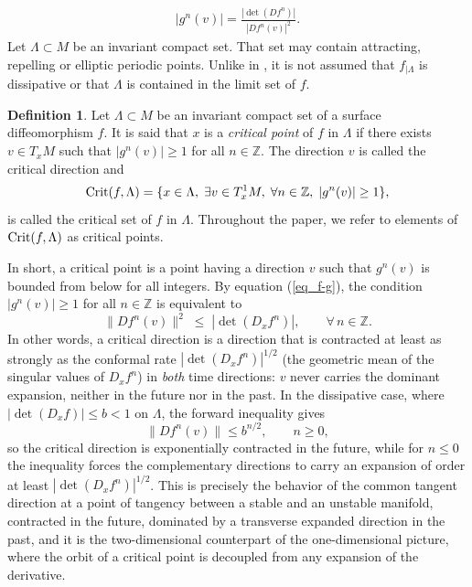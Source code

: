\documentclass[a4paper,11pt]{article}
\theoremstyle{definition}
\newtheorem{definition}[lemma]{Definition}
\def\ZZ{{\mathbb Z}}
\def\La{\Lambda}
\def\La{\Lambda}
\begin{document}
\begin{eqnarray}\label{eq_f-g}
    |g^n(v)|=  \frac{|\det(Df^n)|}{|Df^n(v)|^2}.
\end{eqnarray}
Let $\Lambda\subset M$ be an invariant compact set. That set  may contain attracting, repelling or elliptic  periodic points. Unlike  in \cite{PRH}, it is not assumed that $f_{|\Lambda}$ is  dissipative or that  $\La$ is contained in the limit set of $f$.


\begin{definition}\label{def:crit} Let $\Lambda\subset M$ be an invariant compact set of  a surface diffeomorphism $f.$ It is said that $x$ is a {\it critical point} of $f$ in $\La$ if there exists $v\in T_xM$ such that 
$|g^n(v)|\geq 1$ for all $n\in \ZZ$. The direction $v$ is called the critical direction and 
 $${\rm Crit}(f,\Lambda)=\{x\in\Lambda, \; \exists v\in T_x^1M,\;
\forall n\in \ZZ, \; |g^n(v)|\geq 1\},$$ is called the critical set of $f$ in $\Lambda.$ Throughout the paper, we refer to elements of ${\rm Crit}(f,\Lambda)$ as
critical points.
\end{definition}


In short,  a critical point is a point having a direction $v$ such that $g^n(v)$ is bounded from below for all integers.  By equation (\ref{eq_f-g}), the condition $|g^n(v)|\geq 1$ for all $n\in\ZZ$ is
equivalent to
$$\|Df^n(v)\|^2\;\leq\; |\det(D_xf^n)|, \qquad \forall\, n\in \ZZ.$$
In other words, a critical direction is a direction that is contracted at
least as strongly as the conformal rate $|\det(D_xf^n)|^{1/2}$ (the geometric
mean of the singular values of $D_xf^n$) in \emph{both} time directions: $v$
never carries the dominant expansion, neither in the future nor in the past.
In the dissipative case, where $|\det(D_xf)|\leq b<1$ on $\La$, the forward
inequality gives
$$\|Df^n(v)\|\leq b^{n/2},\qquad n\geq 0,$$
so the critical direction is exponentially contracted in the future, while
for $n\leq 0$ the inequality forces the complementary directions to carry an
expansion of order at least $|\det(D_xf^{n})|^{1/2}$. This is precisely the
behavior of the common tangent direction at a point of tangency between a
stable and an unstable manifold, contracted in the future, dominated by a
transverse expanded direction in the past, and it is the two-dimensional
counterpart of the one-dimensional picture, where the orbit of a critical
point is decoupled from any expansion of the derivative.
 
\end{document}
